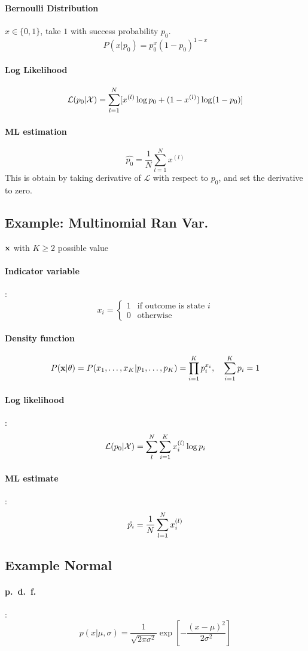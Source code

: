 \paragraph{Bernoulli Distribution} $x \in\{0, 1\}$, take $1$ with success
probability $p_0$.
\[P(x|p_0) = p_0^x(1-p_0)^{1-x}\]
\paragraph{Log Likelihood}\[\mathcal{L}(p_0|\mathcal{X}) = \sum_{l=1}^N[x^{(l)}\log
p_0+(1-x^{(l)})\log(1-p_0)]\]
\paragraph{ML estimation} 
\[\hat{p_0} = \frac{1}{N}\sum_{l=1}^N x^{(l)}\]
This is obtain by taking derivative of $\mathcal{L}$ with respect to
$p_0$, and set the derivative to zero.

\subsection{Example: Multinomial Ran Var.} 
$\mathbf{x}$ with $K\geq 2$ possible value
\paragraph{Indicator variable}: \[x_i = \begin{cases}1 & \mbox{if outcome
    is state }i \\ 0 & \mbox{otherwise}\end{cases}\]
\paragraph{Density function}
\[ P(\mathbf{x}|\theta) = P(x_1,\dots, x_K|p_1,\dots, p_K) =
\prod^K_{i=1}p_i^{x_i}, \quad 
\sum_{i=1}^K p_i = 1 \]

\paragraph{Log likelihood}: \[\mathcal{L} (p_0|\mathcal{X}) = \sum_l^N\sum_{i=1}^K x_i^{(l)}
    \log p_i\]

\paragraph{ML estimate}: \[\hat{p_i} = \frac{1}{N}\sum_{l=1}^N x^{(l)}_i\]

\subsection{Example Normal} \paragraph{p.\ d.\ f.}: \[p(x|\mu, \sigma ) =
    \frac{1}{\sqrt{2\pi\sigma^2}}\exp[-\frac{(x-\mu)^2}{2\sigma^2}]\]
